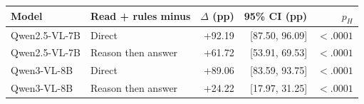 \begin{tabular}{llrrr}
\toprule
Model & Read + rules minus & $\Delta$ (pp) & 95\% CI (pp) & $p_H$ \\
\midrule
Qwen2.5-VL-7B & Direct & +92.19 & [87.50, 96.09] & $<.0001$ \\
Qwen2.5-VL-7B & Reason then answer & +61.72 & [53.91, 69.53] & $<.0001$ \\
Qwen3-VL-8B & Direct & +89.06 & [83.59, 93.75] & $<.0001$ \\
Qwen3-VL-8B & Reason then answer & +24.22 & [17.97, 31.25] & $<.0001$ \\
\bottomrule
\end{tabular}
